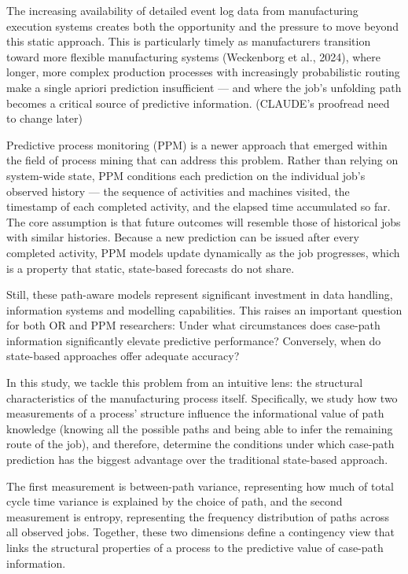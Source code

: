 \documentclass[
]{ceurart}
\begin{document}
The increasing availability of detailed event log data from manufacturing execution systems creates both the opportunity and the 
pressure to move beyond this static approach. This is particularly timely as manufacturers transition toward more flexible manufacturing systems
 (Weckenborg et al., 2024), where longer, more complex production processes with increasingly probabilistic routing make a single apriori prediction insufficient 
 — and where the job's unfolding path becomes a critical source of predictive information. (CLAUDE's proofread need to change later)

Predictive process monitoring (PPM) is a newer approach that emerged within the field of process mining that can address this problem. 
Rather than relying on system-wide state, PPM conditions each prediction on the individual job's observed history — 
the sequence of activities and machines visited, the timestamp of each completed activity, and the elapsed time accumulated so far. 
The core assumption is that future outcomes will resemble those of historical jobs with similar histories. Because a new prediction 
can be issued after every completed activity, PPM models update dynamically as the job progresses, which is a property that static, state-based forecasts do not share.

Still, these path-aware models represent significant investment in data handling, information systems and modelling capabilities. This raises an important question for both OR and PPM researchers: Under what circumstances does case-path information significantly elevate predictive performance? 
Conversely, when do state-based approaches offer adequate accuracy? 

In this study, we tackle this problem from an intuitive lens: the structural characteristics of the manufacturing process itself. Specifically, we study how two measurements of a process' structure influence the informational value of 
path knowledge (knowing all the possible paths and being able to infer the remaining route of the job), and therefore, determine the conditions under which case-path prediction 
has the biggest advantage over the traditional state-based approach. 

The first measurement is between-path variance, representing how much of total cycle time variance is explained by the choice of path, and the second measurement is entropy, representing the frequency distribution of paths across all observed jobs.
Together, these two dimensions define a contingency view that links the structural properties of a process to the predictive value of case-path information.
\end{document}

